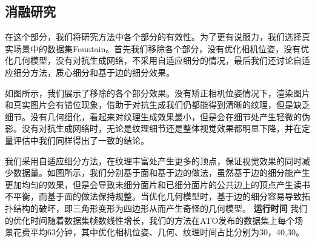 \subsection{消融研究}
在这个部分，我们将研究方法中各个部分的有效性。为了更有说服力，我们选择真实场景中的数据集Fountain。首先我们移除各个部分，没有优化相机位姿，没有优化几何模型，没有对抗生成网络，不采用自适应细分的情况，最后我们还讨论自适应细分方法，质心细分和基于边的细分效果。\par
如图所示，我们展示了移除的各个部分效果。没有矫正相机位姿情况下，渲染图片和真实图片会有错位现象，借助于对抗生成我们仍都能得到清晰的纹理，但是缺乏细节。没有几何细化，看起来对纹理生成效果最小，但是会在细节处产生轻微的伪影。没有对抗生成网络时，无论是纹理细节还是整体视觉效果都明显下降，并在定量评估中我们同样得出了一致的结论。\par
我们采用自适应细分方法，在纹理丰富处产生更多的顶点，保证视觉效果的同时减少数据量。如图所示，我们分别基于面和基于边的做法，虽然基于边的细分能产生更加均匀的效果，但是会导致未细分面片和已细分面片的公共边上的顶点产生读书不平衡，而基于面的做法保持规整。当优化几何模型时，基于边的细分容易导致拓扑结构的破坏，即三角形变形为四边形从而产生奇怪的几何模型。
\noindent \textbf{运行时间}
我们的优化时间随着数据集帧数线性增长，我们的方法在ATO发布的数据集上每个场景花费平均63分钟，其中优化相机位姿、几何、纹理时间占比分别为30，40,30。
